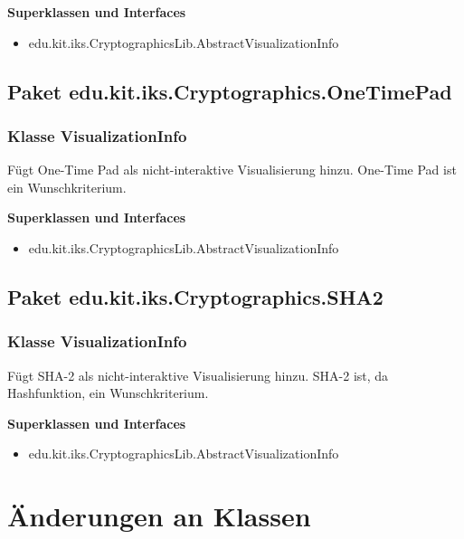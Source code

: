 \documentclass{article}
\begin{document}
      \textbf{Superklassen und Interfaces}
      \begin{itemize}
        \item edu.kit.iks.CryptographicsLib.AbstractVisualizationInfo
      \end{itemize}

  \subsection{Paket edu.kit.iks.Cryptographics.OneTimePad}
    \subsubsection{Klasse VisualizationInfo}
      Fügt One-Time Pad als nicht-interaktive Visualisierung hinzu. One-Time Pad ist ein Wunschkriterium.\newline

      \textbf{Superklassen und Interfaces}
      \begin{itemize}
        \item edu.kit.iks.CryptographicsLib.AbstractVisualizationInfo
      \end{itemize}

  \subsection{Paket edu.kit.iks.Cryptographics.SHA2}
    \subsubsection{Klasse VisualizationInfo}
      Fügt SHA-2 als nicht-interaktive Visualisierung hinzu. SHA-2 ist, da Hashfunktion, ein Wunschkriterium.\newline

      \textbf{Superklassen und Interfaces}
      \begin{itemize}
        \item edu.kit.iks.CryptographicsLib.AbstractVisualizationInfo
      \end{itemize}


\section{Änderungen an Klassen}
\end{document}
